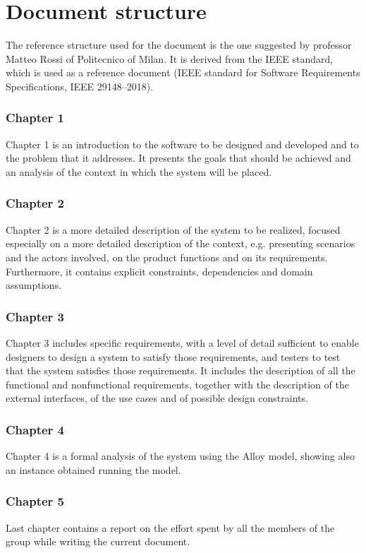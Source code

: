 \documentclass[a4paper,oneside,11pt]{book}   %
\begin{document}
    \section{Document structure}
    The reference structure used for the document is the one suggested by professor Matteo Rossi of Politecnico of Milan. It is derived from the IEEE standard, which is used as a reference document (IEEE standard for Software Requirements Specifications, IEEE 29148--2018).
    
    \subsubsection{Chapter 1} 
    Chapter 1 is an introduction to the software to be designed and developed and to the problem that it addresses. It presents the goals that should be achieved and an analysis of the context in which the system will be placed.
    \subsubsection{Chapter 2} 
    Chapter 2 is a more detailed description of the system to be realized, focused especially on a more detailed description of the context, e.g. presenting scenarios and the actors involved, on the product functions and on its requirements. Furthermore, it contains explicit constraints, dependencies and domain assumptions.
    \subsubsection{Chapter 3} Chapter 3 includes specific requirements, with a level of detail sufficient to enable designers to design a system to satisfy those requirements, and testers to test that the system satisfies those requirements. It includes the description of all the functional and nonfunctional requirements, together with the description of the external interfaces, of the use cases and of possible design constraints.
    \subsubsection{Chapter 4} 
    Chapter 4 is a formal analysis of the system using the Alloy model, showing also an instance obtained running the model.
    \subsubsection{Chapter 5}
    Last chapter contains a report on the effort spent by all the members of the group while writing the current document.
\end{document}
